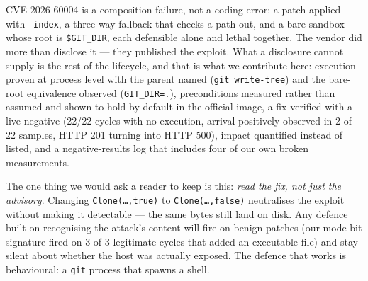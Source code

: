 \documentclass[journal]{IEEEtran}
\begin{document}
CVE-2026-60004 is a composition failure, not a coding error: a patch applied
with \texttt{--index}, a three-way fallback that checks a path out, and a bare
sandbox whose root is \texttt{\$GIT\_DIR}, each defensible alone and lethal
together. The vendor did more than disclose it --- they published the exploit.
What a disclosure cannot supply is the rest of the lifecycle, and that is what
we contribute here: execution proven at process level with the parent named
(\texttt{git write-tree}) and the bare-root equivalence observed
(\texttt{GIT\_DIR=.}), preconditions measured rather than assumed and shown to
hold by default in the official image, a fix verified with a live negative
(22/22 cycles with no execution, arrival positively observed in 2 of 22 samples,
HTTP 201 turning into HTTP 500), impact
quantified instead of listed, and a negative-results log that includes four of
our own broken measurements.

The one thing we would ask a reader to keep is this: \emph{read the fix, not
just the advisory}. Changing \texttt{Clone(\dots,true)} to
\texttt{Clone(\dots,false)} neutralises the exploit without making it
detectable --- the same bytes still land on disk. Any defence built on
recognising the attack's content will fire on benign patches (our mode-bit
signature fired on 3 of 3 legitimate cycles that added an executable file) and
stay silent about whether the host was actually exposed. The defence that works is
behavioural: a \texttt{git} process that spawns a shell.
\end{document}
